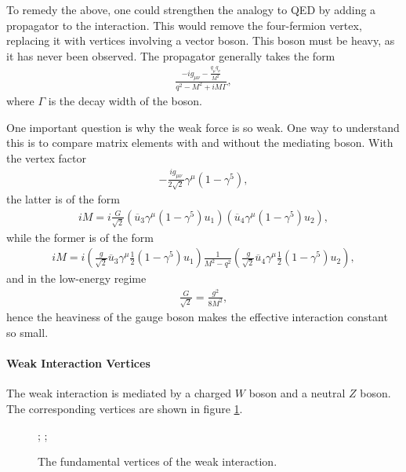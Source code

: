 To remedy the above, one could strengthen the analogy to QED by adding a propagator to the interaction. This would remove the four-fermion vertex, replacing it with vertices involving a vector boson. This boson must be heavy, as it has never been observed. The propagator generally takes the form
\begin{align*}
	\frac{-ig_{\mu\nu} - \frac{q_{\mu}q_{\nu}}{M^{2}}}{q^{2} - M^{2} + iM\Gamma},
\end{align*}
where $\Gamma$ is the decay width of the boson.

One important question is why the weak force is so weak. One way to understand this is to compare matrix elements with and without the mediating boson. With the vertex factor
\begin{align*}
	-\frac{ig_{\mu\nu}}{2\sqrt{2}}\gamma^{\mu}(1 - \gamma^{5}),
\end{align*}
the latter is of the form
\begin{align*}
	iM = i\frac{G}{\sqrt{2}}\left(\overline{u}_{3}\gamma^{\mu}(1 - \gamma^{5})u_{1}\right)\left(\overline{u}_{4}\gamma^{\mu}(1 - \gamma^{5})u_{2}\right),
\end{align*}
while the former is of the form
\begin{align*}
	iM = i\left(\frac{g}{\sqrt{2}}\overline{u}_{3}\gamma^{\mu}\frac{1}{2}(1 - \gamma^{5})u_{1}\right)\frac{1}{M^{2} - q^{2}}\left(\frac{g}{\sqrt{2}}\overline{u}_{4}\gamma^{\mu}\frac{1}{2}(1 - \gamma^{5})u_{2}\right),
\end{align*}
and in the low-energy regime
\begin{align*}
	\frac{G}{\sqrt{2}} = \frac{g^{2}}{8M^{2}},
\end{align*}
hence the heaviness of the gauge boson makes the effective interaction constant so small.

\paragraph{Weak Interaction Vertices}
The weak interaction is mediated by a charged $W$ boson and a neutral $Z$ boson. The corresponding vertices are shown in figure \ref{fig:weak_verts}.

\begin{figure}[!ht]
	\centering
	;
	;
	\caption{The fundamental vertices of the weak interaction.}
	\label{fig:weak_verts}
\end{figure}

